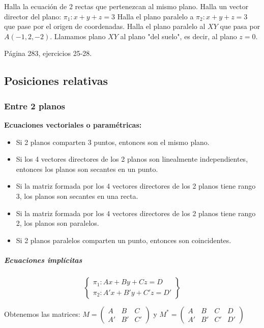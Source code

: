 \begin{problem}
\ppart Halla la ecuación de 2 rectas que pertenezcan al mismo plano.
\ppart Halla un vector director del plano: $\pi_1: x+y+z = 3$
\ppart Halla el plano paralelo a $\pi_2: x+y+z = 3$ que pase por el origen de coordenadas.
\ppart Halla el plano paralelo al $XY$ que pasa por $A(-1,2,-2)$.
\obs Llamamos plano $XY$ al plano "del suelo", es decir, al plano $z=0$.

\ppart Página 283, ejercicios 25-28.

\solution

\end{problem}

\subsection{Posiciones relativas}

\subsubsection{Entre 2 planos}  

\begin{framed}
\textbf{Ecuaciones vectoriales o paramétricas:}
  \begin{itemize}
    \item Si 2 planos comparten 3 puntos, entonces son el mismo plano.
    \item Si los 4 vectores directores de los 2 planos son linealmente independientes, entonces los planos son secantes en un punto.
    \item Si la matriz formada por los 4 vectores directores de los 2 planos tiene rango 3, los planos son secantes en una recta.
    \item Si la matriz formada por los 4 vectores directores de los 2 planos tiene rango 2, los planos son paralelos.
    \item Si 2 planos paralelos comparten un punto, entonces son coincidentes.
  \end{itemize}
\end{framed}



\subparagraph{Ecuaciones implícitas}

\[
\left\{\begin{array}{c}
\pi_1: Ax+By+Cz = D\\
\pi_2: A'x+B'y+C'z = D'
\end{array}\right\}
\]

Obtenemos las matrices: $M = \displaystyle\begin{pmatrix}A&B&C\\A'&B'&C'\end{pmatrix}$ y $M^* = \displaystyle\begin{pmatrix}A&B&C&D\\A'&B'&C'&D'\end{pmatrix}$

